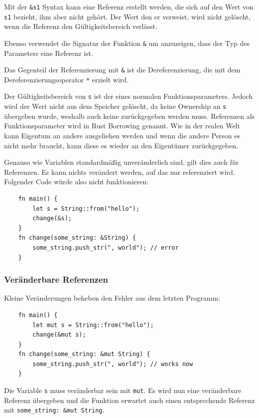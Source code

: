 Mit der \verb"&s1" Syntax kann eine Referenz erstellt werden, die sich auf den Wert von \verb"s1" bezieht, ihm aber nicht gehört. Der Wert den er verweist, wird nicht gelöscht, wenn die Referenz den Gültigkeitsbereich verlässt.

Ebenso verwendet die Signatur der Funktion \verb"&" um anzuzeigen, dass der Typ des Parameters eine Referenz ist.

Das Gegenteil der Referenzierung mit \verb"&" ist die Dereferenzierung, die mit dem Dereferenzierungsoperator \verb"*" erzielt wird.

Der Gültigkeitsbereich von \verb"s" ist der eines normalen Funktionsparameters. Jedoch wird der Wert nicht aus dem Speicher gelöscht, da keine Ownership an \verb"s" übergeben wurde, weshalb auch keine zurückgegeben werden muss. Referenzen als Funktionsparameter wird in Rust \glqq Borrowing\grqq{} genannt. Wie in der realen Welt kann Eigentum an andere ausgeliehen werden und wenn die andere Person es nicht mehr braucht, kann diese es wieder an den Eigentümer zurückgegeben.

Genauso wie Variablen standardmäßig unveränderlich sind, gilt dies auch für Referenzen. Es kann nichts verändert werden, auf das nur referenziert wird. Folgender Code würde also nicht funktionieren:

\begin{lstlisting}
    fn main() {
        let s = String::from("hello");
        change(&s);
    }
    fn change(some_string: &String) {
        some_string.push_str(", world"); // error
    }
\end{lstlisting}

\subsubsection{Veränderbare Referenzen}

Kleine Veränderungen beheben den Fehler aus dem letzten Programm:

\begin{lstlisting}
    fn main() {
        let mut s = String::from("hello");
        change(&mut s);
    }
    fn change(some_string: &mut String) {
        some_string.push_str(", world"); // works now
    }
\end{lstlisting}

Die Variable \verb"s" muss veränderbar sein mit \verb"mut". Es wird nun eine veränderbare Referenz übergeben und die Funktion erwartet auch einen entsprechende Referenz mit \verb"some_string: &mut String".

